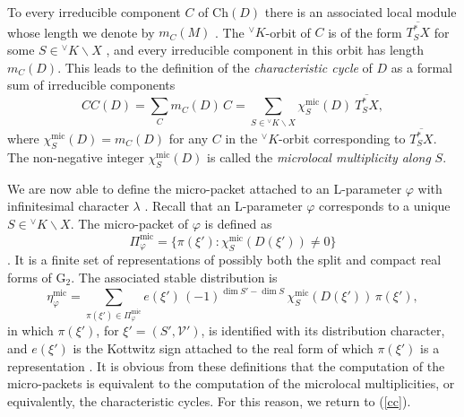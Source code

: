 \documentclass[a4paper, 11pt]{article}
\begin{document}
To every irreducible component $C$ of $\mathrm{Ch}(D)$
there is an associated local module whose length we denote by
$m_{C}(M)$ \cite[Definition 19.7]{ABV}.  The ${^\vee}K$-orbit of $C$
is of the form 
$\overline{T^{*}_{S}X}$ for some $S \in {^\vee}K \backslash X$
\cite[Lemma 19.2 (b)]{ABV}, and every irreducible component in this
orbit has length $m_{C}(D)$.  This leads to the definition of the
\emph{characteristic cycle} of $D$ as a formal sum of irreducible components
\begin{equation}
\label{cc}
CC(D) = \sum_{C} m_{C}(D) \, C = \sum_{S \in {^\vee}K \backslash X}
\chi_{S}^{\mathrm{mic}}(D) \ \overline{T^{*}_{S}X},
\end{equation}
where $\chi_{S}^{\mathrm{mic}}(D) = m_{C}(D)$ for any $C$ in the
${^\vee}K$-orbit corresponding to $\overline{T^{*}_{S}X}$.  The
non-negative integer 
$
\chi_{S}^{\mathrm{mic}}(D)
$
 is called the
\emph{microlocal multiplicity along} $S$.  

We are now able to define the micro-packet attached to an L-parameter $\varphi$
with infinitesimal character $\lambda$  \cite[Definition 5.2,
  Proposition 5.6]{ABV}.
Recall that  an L-parameter $\varphi$ corresponds
to a unique $S \in {^\vee}K \backslash X$.  The micro-packet of
$\varphi$ is defined as
\begin{equation}\label{mpacket}
\Pi^{\mathrm{mic}}_{\varphi} = \{ \pi(\xi') :
\chi_{S}^{\mathrm{mic}}(D(\xi')) \neq 0 \}
\end{equation}  
\cite[Definition 19.13]{ABV}.  It is a finite set of representations
of possibly both the split and compact real forms of
$\mathrm{G}_{2}$.  The
associated stable distribution is 
\begin{equation}
\label{etamic}
\eta^{\mathrm{mic}}_{\varphi} = \sum_{\pi(\xi') \in
  \Pi^{\mathrm{mic}}_{\varphi}} e(\xi') \, (-1)^{\dim S' - \dim S}\, 
\chi^{\mathrm{mic}}_{S} (D(\xi')) \, \pi(\xi'),
\end{equation}
in which $\pi(\xi')$, for $\xi' = (S', \mathcal{V}')$, is identified with
its distribution character, 
and $e(\xi')$ is the Kottwitz sign attached to the real form of which
$\pi(\xi')$ is a representation \cite[(17.24)(g), Corollary 19.16]{ABV}.  
It is obvious from these definitions that the computation of the
micro-packets is equivalent to the computation of the microlocal
multiplicities, or equivalently, the characteristic
cycles.  For this reason, we return to (\ref{cc}).
\end{document}
